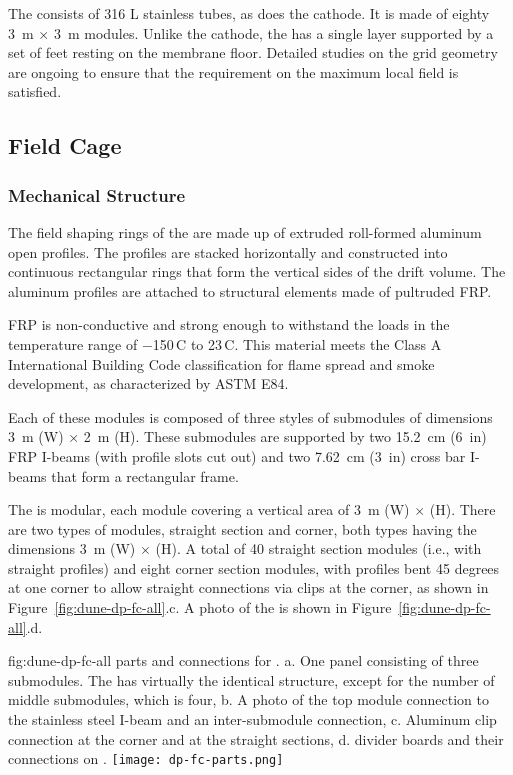The  consists of 316 L stainless tubes, as does the cathode. It is made of eighty \SI{3}{\m} $\times$ \SI{3}{\m} modules. Unlike the cathode, the  has a single layer supported by a set of feet resting on the membrane floor.
Detailed studies on the grid geometry are ongoing to ensure that the requirement on the maximum local field is satisfied.

\subsection{Field Cage}

\subsubsection{Mechanical Structure}
The field shaping rings of the  are made up of extruded roll-formed aluminum open profiles.  
The profiles are stacked horizontally and constructed into continuous rectangular rings that form the vertical sides of the drift volume. The aluminum profiles are attached to structural elements made of pultruded  FRP. 

FRP is non-conductive and strong enough to withstand the  loads in the temperature range of \num{-150}\,C to \num{23}\,C.
This material meets the  Class A International Building Code classification for flame spread and smoke development, 
as characterized by ASTM E84. 


Each of these modules is composed of three 
styles of submodules of dimensions \SI{3}{\m} (W) $\times$ \SI{2}{\m} (H). These submodules are supported by two \SI{15.2}{cm} (\SI{6}{in}) FRP I-beams (with profile slots cut out) and two \SI{7.62}{cm} (\SI{3}{in}) cross bar I-beams that form a rectangular frame.  


The  is modular, each module covering a vertical area of \SI{3}{\m} (W) $\times$ \tpcheight (H). 
There are two types of modules, straight section and corner, both types having the dimensions \SI{3}{\m} (W) $\times$ \tpcheight (H). A total of \num{40} straight section modules (i.e., with straight profiles) and eight corner section modules, with profiles bent \num{45} degrees at one corner to allow straight connections via clips at the corner, as shown in Figure~\ref{fig:dune-dp-fc-all}.c.  A photo of the   is shown in Figure~\ref{fig:dune-dp-fc-all}.d.

\begin{dunefigure}{fig:dune-dp-fc-all}
{ parts and connections for .  a. One   panel consisting of three submodules.  The  has virtually the identical structure, except for the number of middle submodules, which is four, b. A photo of the top module connection to the stainless steel I-beam and an inter-submodule connection, c. Aluminum clip connection at the corner and at the straight sections, d.  divider boards and their connections on  . }
\texttt{[image: dp-fc-parts.png]}
\end{dunefigure}


